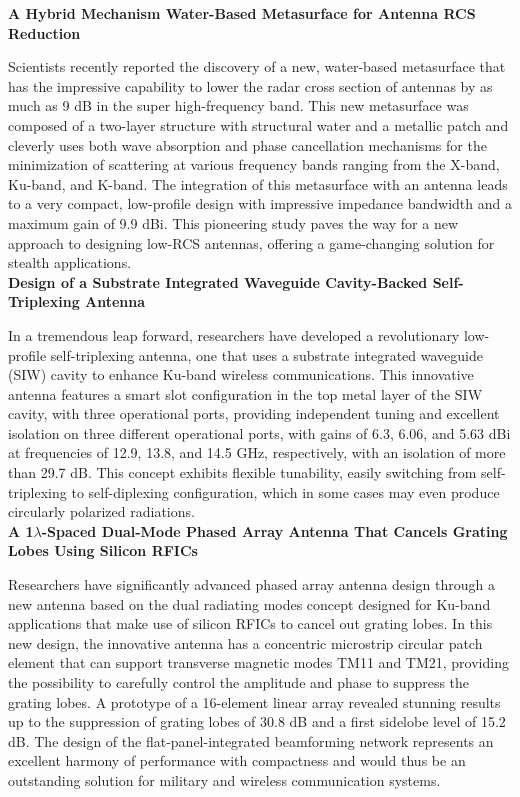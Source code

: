 \documentclass[12pt]{article}
\begin{document}
\noindent \textbf{A Hybrid Mechanism Water-Based Metasurface for Antenna RCS Reduction}
\par Scientists recently reported the discovery of a new, water-based metasurface that has the impressive capability to lower the radar cross section of antennas by as much as 9 dB in the super high-frequency band. This new metasurface was composed of a two-layer structure with structural water and a metallic patch and cleverly uses both wave absorption and phase cancellation mechanisms for the minimization of scattering at various frequency bands ranging from the X-band, Ku-band, and K-band. The integration of this metasurface with an antenna leads to a very compact, low-profile design with impressive impedance bandwidth and a maximum gain of 9.9 dBi. This pioneering study paves the way for a new approach to designing low-RCS antennas, offering a game-changing solution for stealth applications.\\

\noindent \textbf{Design of a Substrate Integrated Waveguide Cavity-Backed Self-Triplexing Antenna}
\par In a tremendous leap forward, researchers have developed a revolutionary low-profile self-triplexing antenna, one that uses a substrate integrated waveguide (SIW) cavity to enhance Ku-band wireless communications. This innovative antenna features a smart slot configuration in the top metal layer of the SIW cavity, with three operational ports, providing independent tuning and excellent isolation on three different operational ports, with gains of 6.3, 6.06, and 5.63 dBi at frequencies of 12.9, 13.8, and 14.5 GHz, respectively, with an isolation of more than 29.7 dB. This concept exhibits flexible tunability, easily switching from self-triplexing to self-diplexing configuration, which in some cases may even produce circularly polarized radiations. \\

\noindent \textbf{A 1$\lambda$-Spaced Dual-Mode Phased Array Antenna That Cancels Grating Lobes Using Silicon RFICs}
\par Researchers have significantly advanced phased array antenna design through a new antenna based on the dual radiating modes concept designed for Ku-band applications that make use of silicon RFICs to cancel out grating lobes. In this new design, the innovative antenna has a concentric microstrip circular patch element that can support transverse magnetic modes TM11 and TM21, providing the possibility to carefully control the amplitude and phase to suppress the grating lobes. A prototype of a 16-element linear array revealed stunning results up to the suppression of grating lobes of 30.8 dB and a first sidelobe level of 15.2 dB. The design of the flat-panel-integrated beamforming network represents an excellent harmony of performance with compactness and would thus be an outstanding solution for military and wireless communication systems.\\
\end{document}
